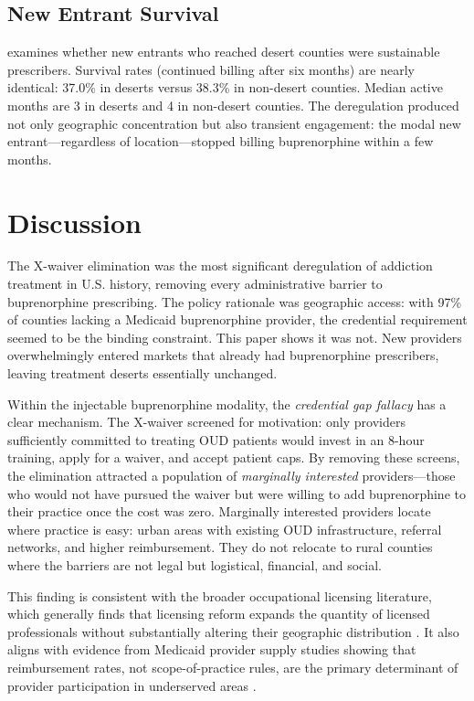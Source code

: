 \documentclass[12pt]{article}
\begin{document}
\subsection{New Entrant Survival}



 examines whether new entrants who reached desert counties were sustainable prescribers. Survival rates (continued billing after six months) are nearly identical: 37.0\% in deserts versus 38.3\% in non-desert counties. Median active months are 3 in deserts and 4 in non-desert counties. The deregulation produced not only geographic concentration but also transient engagement: the modal new entrant---regardless of location---stopped billing buprenorphine within a few months.

\section{Discussion}

The X-waiver elimination was the most significant deregulation of addiction treatment in U.S. history, removing every administrative barrier to buprenorphine prescribing. The policy rationale was geographic access: with 97\% of counties lacking a Medicaid buprenorphine provider, the credential requirement seemed to be the binding constraint. This paper shows it was not. New providers overwhelmingly entered markets that already had buprenorphine prescribers, leaving treatment deserts essentially unchanged.

Within the injectable buprenorphine modality, the \textit{credential gap fallacy} has a clear mechanism. The X-waiver screened for motivation: only providers sufficiently committed to treating OUD patients would invest in an 8-hour training, apply for a waiver, and accept patient caps. By removing these screens, the elimination attracted a population of \textit{marginally interested} providers---those who would not have pursued the waiver but were willing to add buprenorphine to their practice once the cost was zero. Marginally interested providers locate where practice is easy: urban areas with existing OUD infrastructure, referral networks, and higher reimbursement. They do not relocate to rural counties where the barriers are not legal but logistical, financial, and social.

This finding is consistent with the broader occupational licensing literature, which generally finds that licensing reform expands the quantity of licensed professionals without substantially altering their geographic distribution \citep{kleiner2006, thornton2011}. It also aligns with evidence from Medicaid provider supply studies showing that reimbursement rates, not scope-of-practice rules, are the primary determinant of provider participation in underserved areas \citep{buchmueller2015, decker2012}.
\end{document}
